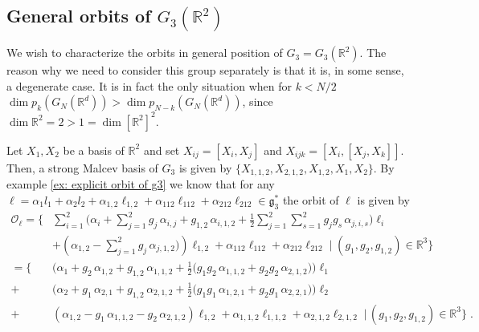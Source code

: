 \documentclass[pdflatex,sn-mathphys-num]{sn-jnl}
\theoremstyle{thmstyletwo}
\theoremstyle{thmstyleone}
\theoremstyle{thmstyletwo}
\newcommand{\fancyg}{\mathfrak{g}}
\newcommand{\R}{\mathbb{R}}
\begin{document}
\begin{appendices}
			\subsection{General orbits of \texorpdfstring{$G_3(\R^2)$}{G3(R2)}}\label{sec: General orbits of G3R2}
			We wish to characterize the orbits in general position of $G_3 = G_3(\R^2)$. The reason why we need to consider this group separately is that it is, in some sense, a degenerate case. It is in fact the only situation when for $k<N/2$ $\dim p_k(G_N(\R^d))> \dim p_{N-k}(G_N(\R^d))$, since $\dim \R^2 = 2 > 1 = \dim [\R^2]^2$.
			
			Let $X_1, X_2$ be a basis of $\R^2$ and set $X_{ij} = [X_i,X_j]$ and $X_{ijk} = [X_i,[X_j, X_k]]$. Then, a strong Malcev basis of $G_3$ is given by
			$\{X_{1,1,2}, X_{2,1,2}, X_{1,2}, X_1, X_2\}$. By example \ref{ex: explicit orbit of g3} we know that for any $\ell = \alpha_1l_1+ \alpha_2l_2+ \alpha_{1,2}\ell_{1,2}+ \alpha_{112}\ell_{112} + \alpha_{212}\ell_{212} \in \fancyg_3^*$ the orbit of $\ell$ is given by
			\begin{equation}\label{eq: explicit orbit of G3R2}
				\begin{aligned}
					\mathcal{O}_{\ell} = \Bigg\{ 
					&\sum_{i=1}^2 \Bigg( \alpha_i
					+ \sum_{j=1}^{2} g_j\, \alpha_{i,j} 
					+g_{1,2}\, \alpha_{i,1,2} + \frac{1}{2} \sum_{j=1}^{2} \sum_{s=1}^{2} g_j g_s\, \alpha_{j,i,s}
					\Bigg) \ell_i \\
					&+ \left( \alpha_{1,2}- \sum_{j=1}^{2} g_j\, \alpha_{j,1,2}) \right) \ell_{1,2}
					+ \alpha_{112}\ell_{112} + \alpha_{212}\ell_{212} \;\Big|\; (g_1,g_2, g_{1,2}) \in \mathbb{R}^3\Bigg\}\\
					= \Bigg\{ 
					&\Big( \alpha_1 
					+ g_2\, \alpha_{1,2} 
					+ g_{1,2}\, \alpha_{1,1,2} 
					+ \frac{1}{2} \big( 
					g_1 g_2\, \alpha_{1,1,2}
					+ g_2 g_2\, \alpha_{2,1,2} 
					\big) \Big) \ell_1 \\
					+ &\Big( \alpha_2 
					+ g_1\, \alpha_{2,1} 
					+ g_{1,2}\, \alpha_{2,1,2} 
					+ \frac{1}{2} \big( 
					g_1 g_1\, \alpha_{1,2,1}
					+ g_2 g_1\, \alpha_{2,2,1} 
					\big) \Big) \ell_2 \\
					+ &\left( \alpha_{1,2} 
					- g_1\, \alpha_{1,1,2} - g_2\, \alpha_{2,1,2} \right) \ell_{1,2} 
					+ \alpha_{1,1,2}\ell_{1,1,2} + \alpha_{2,1,2}\ell_{2,1,2}
					\;\Big|\, (g_1,g_2, g_{1,2}) \in \mathbb{R}^3
					\Bigg\} \;.
				\end{aligned}
			\end{equation}
			

\end{appendices}
\end{document}
